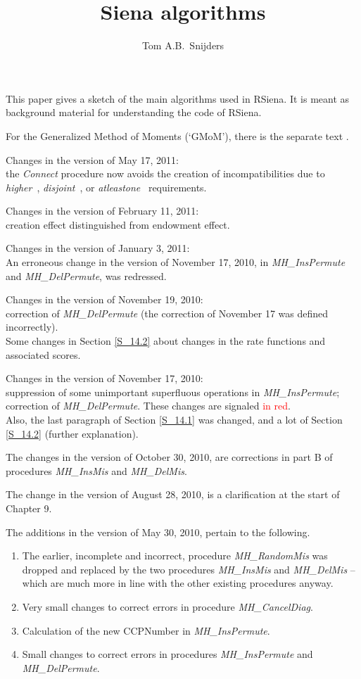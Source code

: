 \documentclass[a4paper,12pt,fleqn]{article}
\title{Siena algorithms}
\author{Tom A.B.\ Snijders }
\newcommand{\nnm}[1]{\textsf{\small\textit{#1}\ }}
\newcommand{\remark}[1]{{\textcolor[named]{Red}{#1}}}
\begin{document}
\maketitle

\tableofcontents
\newpage

This paper gives a sketch of the main algorithms used in RSiena.
It is meant as background material for understanding the code of
RSiena.

For the Generalized Method of Moments (`GMoM'), there is the
separate text .

\iffalse
Changes in the version of May 17, 2011:\\
the \emph{Connect} procedure now avoids the creation of
incompatibilities due to  \nnm{higher},
\nnm{disjoint}, or \nnm{atleastone} requirements.

Changes in the version of February 11, 2011:\\
creation effect distinguished from endowment effect.

Changes in the version of January 3, 2011:\\
An erroneous change in the version of November 17, 2010,
 in \textit{MH\_InsPermute} and  \textit{MH\_DelPermute}, was redressed.

Changes in the version of November 19, 2010:\\
correction of \textit{MH\_DelPermute} (the correction
of November 17 was defined incorrectly).\\
Some changes in Section \ref{S_14.2} about changes in the rate functions
and associated scores.

Changes in the version of November 17, 2010:\\
suppression of some unimportant superfluous operations in \textit{MH\_InsPermute};
correction of \textit{MH\_DelPermute}. These changes are signaled \remark{in red}.\\
Also, the last paragraph of Section \ref{S_14.1} was changed,
and a lot of Section \ref{S_14.2} (further explanation).

The changes in the version of October 30, 2010, are corrections in part B
of procedures \textit{MH\_InsMis} and \textit{MH\_DelMis}.

The change in the version of August 28, 2010, is a clarification
at the start of Chapter 9.

The additions in the version of May 30, 2010, pertain
to the following.
\begin{enumerate}
\item The earlier, incomplete and incorrect, procedure \textit{MH\_RandomMis}
      was dropped and replaced by the two procedures \textit{MH\_InsMis}
      and \textit{MH\_DelMis} -- which are much more in line with the
      other existing procedures anyway.
\item Very small changes to correct errors in procedure  \textit{MH\_CancelDiag}.
\item Calculation of the new CCPNumber in \textit{MH\_InsPermute}.
\item Small changes to correct errors in procedures  \textit{MH\_InsPermute}
     and  \textit{MH\_DelPermute}.
\end{enumerate}
\end{document}
